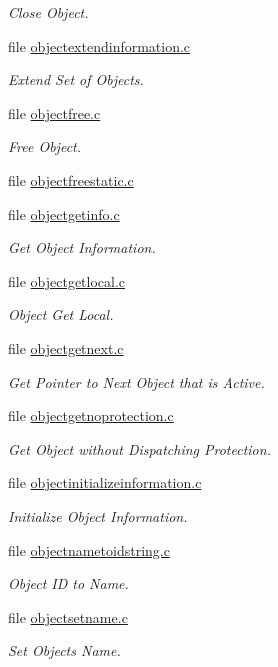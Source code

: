 \begin{DoxyCompactItemize}
\begin{DoxyCompactList}\small\item\em Close Object. \end{DoxyCompactList}\item 
file \mbox{\hyperlink{objectextendinformation_8c}{objectextendinformation.\+c}}
\begin{DoxyCompactList}\small\item\em Extend Set of Objects. \end{DoxyCompactList}\item 
file \mbox{\hyperlink{objectfree_8c}{objectfree.\+c}}
\begin{DoxyCompactList}\small\item\em Free Object. \end{DoxyCompactList}\item 
file \mbox{\hyperlink{objectfreestatic_8c}{objectfreestatic.\+c}}
\item 
file \mbox{\hyperlink{objectgetinfo_8c}{objectgetinfo.\+c}}
\begin{DoxyCompactList}\small\item\em Get Object Information. \end{DoxyCompactList}\item 
file \mbox{\hyperlink{objectgetlocal_8c}{objectgetlocal.\+c}}
\begin{DoxyCompactList}\small\item\em Object Get Local. \end{DoxyCompactList}\item 
file \mbox{\hyperlink{objectgetnext_8c}{objectgetnext.\+c}}
\begin{DoxyCompactList}\small\item\em Get Pointer to Next Object that is Active. \end{DoxyCompactList}\item 
file \mbox{\hyperlink{objectgetnoprotection_8c}{objectgetnoprotection.\+c}}
\begin{DoxyCompactList}\small\item\em Get Object without Dispatching Protection. \end{DoxyCompactList}\item 
file \mbox{\hyperlink{objectinitializeinformation_8c}{objectinitializeinformation.\+c}}
\begin{DoxyCompactList}\small\item\em Initialize Object Information. \end{DoxyCompactList}\item 
file \mbox{\hyperlink{objectnametoidstring_8c}{objectnametoidstring.\+c}}
\begin{DoxyCompactList}\small\item\em Object ID to Name. \end{DoxyCompactList}\item 
file \mbox{\hyperlink{objectsetname_8c}{objectsetname.\+c}}
\begin{DoxyCompactList}\small\item\em Set Objects Name. \end{DoxyCompactList}\end{DoxyCompactItemize}
